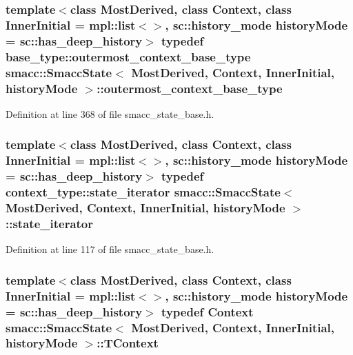 \subsubsection[{\texorpdfstring{outermost\+\_\+context\+\_\+base\+\_\+type}{outermost_context_base_type}}]{\setlength{\rightskip}{0pt plus 5cm}template$<$class Most\+Derived, class Context, class Inner\+Initial = mpl\+::list$<$$>$, sc\+::history\+\_\+mode history\+Mode = sc\+::has\+\_\+deep\+\_\+history$>$ typedef base\+\_\+type\+::outermost\+\_\+context\+\_\+base\+\_\+type {\bf smacc\+::\+Smacc\+State}$<$ Most\+Derived, Context, Inner\+Initial, history\+Mode $>$\+::{\bf outermost\+\_\+context\+\_\+base\+\_\+type}}\hypertarget{classsmacc_1_1SmaccState_aaf76bbe2aa9dd73e3284605f84ab4b16}{}\label{classsmacc_1_1SmaccState_aaf76bbe2aa9dd73e3284605f84ab4b16}


Definition at line 368 of file smacc\+\_\+state\+\_\+base.\+h.

\subsubsection[{\texorpdfstring{state\+\_\+iterator}{state_iterator}}]{\setlength{\rightskip}{0pt plus 5cm}template$<$class Most\+Derived, class Context, class Inner\+Initial = mpl\+::list$<$$>$, sc\+::history\+\_\+mode history\+Mode = sc\+::has\+\_\+deep\+\_\+history$>$ typedef context\+\_\+type\+::state\+\_\+iterator {\bf smacc\+::\+Smacc\+State}$<$ Most\+Derived, Context, Inner\+Initial, history\+Mode $>$\+::{\bf state\+\_\+iterator}}\hypertarget{classsmacc_1_1SmaccState_a12497b38e710f07cacb5d45efc024339}{}\label{classsmacc_1_1SmaccState_a12497b38e710f07cacb5d45efc024339}


Definition at line 117 of file smacc\+\_\+state\+\_\+base.\+h.

\subsubsection[{\texorpdfstring{T\+Context}{TContext}}]{\setlength{\rightskip}{0pt plus 5cm}template$<$class Most\+Derived, class Context, class Inner\+Initial = mpl\+::list$<$$>$, sc\+::history\+\_\+mode history\+Mode = sc\+::has\+\_\+deep\+\_\+history$>$ typedef Context {\bf smacc\+::\+Smacc\+State}$<$ Most\+Derived, Context, Inner\+Initial, history\+Mode $>$\+::{\bf T\+Context}}\hypertarget{classsmacc_1_1SmaccState_a9953ba0428a8c46f7d72c70bc3f87db4}{}\label{classsmacc_1_1SmaccState_a9953ba0428a8c46f7d72c70bc3f87db4}


